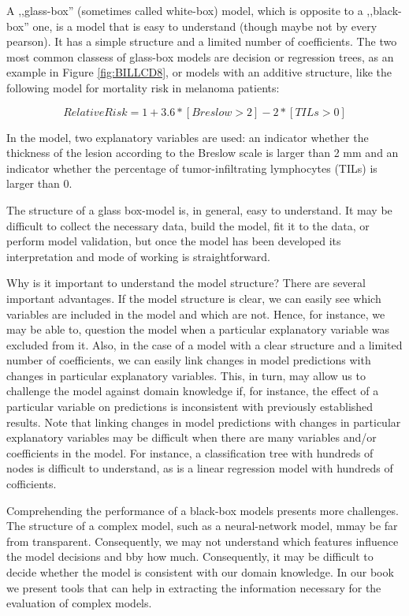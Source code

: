 \documentclass[12pt,]{krantz}
\theoremstyle{definition}
\theoremstyle{definition}
\theoremstyle{definition}
\theoremstyle{remark}
\begin{document}
A ,,glass-box'' (sometimes called white-box) model, which is opposite to
a ,,black-box'' one, is a model that is easy to understand (though maybe
not by every pearson). It has a simple structure and a limited number of
coefficients. The two most common classess of glass-box models are
decision or regression trees, as an example in Figure \ref{fig:BILLCD8},
or models with an additive structure, like the following model for
mortality risk in melanoma patients:

\[
RelativeRisk = 1 + 3.6 * [Breslow > 2] - 2 * [TILs > 0] 
\]

In the model, two explanatory variables are used: an indicator whether
the thickness of the lesion according to the Breslow scale is larger
than 2 mm and an indicator whether the percentage of tumor-infiltrating
lymphocytes (TILs) is larger than 0.

The structure of a glass box-model is, in general, easy to understand.
It may be difficult to collect the necessary data, build the model, fit
it to the data, or perform model validation, but once the model has been
developed its interpretation and mode of working is straightforward.

Why is it important to understand the model structure? There are several
important advantages. If the model structure is clear, we can easily see
which variables are included in the model and which are not. Hence, for
instance, we may be able to, question the model when a particular
explanatory variable was excluded from it. Also, in the case of a model
with a clear structure and a limited number of coefficients, we can
easily link changes in model predictions with changes in particular
explanatory variables. This, in turn, may allow us to challenge the
model against domain knowledge if, for instance, the effect of a
particular variable on predictions is inconsistent with previously
established results. Note that linking changes in model predictions with
changes in particular explanatory variables may be difficult when there
are many variables and/or coefficients in the model. For instance, a
classification tree with hundreds of nodes is difficult to understand,
as is a linear regression model with hundreds of cofficients.

Comprehending the performance of a black-box models presents more
challenges. The structure of a complex model, such as a neural-network
model, mmay be far from transparent. Consequently, we may not understand
which features influence the model decisions and bby how much.
Consequently, it may be difficult to decide whether the model is
consistent with our domain knowledge. In our book we present tools that
can help in extracting the information necessary for the evaluation of
complex models.
\end{document}
